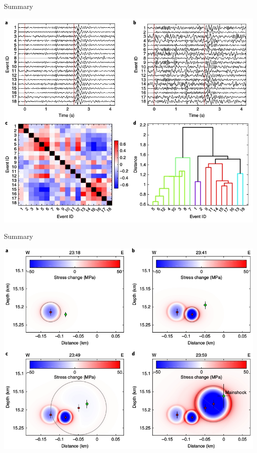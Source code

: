 \documentclass[aspectratio=43,9pt]{beamer}
\begin{document}
\begin{frame}{Summary}
 
 \includegraphics{Figs/fig_2ells.jpg}
 
\end{frame}



\begin{frame}{Summary}
 
 \includegraphics{Figs/fig_3ells.jpg}
 
\end{frame}
\end{document}
